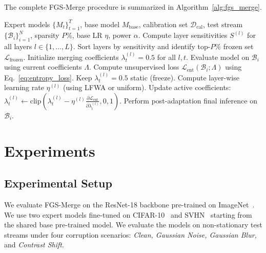 \documentclass{article}
\theoremstyle{plain}
\theoremstyle{definition}
\theoremstyle{remark}
\begin{document}
The complete FGS-Merge procedure is summarized in Algorithm~\ref{alg:fgs_merge}.

\begin{algorithm}[H]
\caption{Fisher-Guided Sparsity-Aware Model Merging (FGS-Merge)}
\label{alg:fgs_merge}
\begin{algorithmic}[1]
\REQUIRE Expert models $\{M_t\}_{t=1}^T$, base model $M_{\text{base}}$, calibration set $\mathcal{D}_{\text{cal}}$, test stream $\{\mathcal{B}_i\}_{i=1}^N$, sparsity $P\%$, base LR $\eta$, power $\alpha$.
\STATE Compute layer sensitivities $S^{(l)}$ for all layers $l \in \{1,\dots,L\}$.
\STATE Sort layers by sensitivity and identify top-$P\%$ frozen set $\mathcal{L}_{\text{frozen}}$.
\STATE Initialize merging coefficients $\lambda_t^{(l)} = 0.5$ for all $l, t$.
    \STATE Evaluate model on $\mathcal{B}_i$ using current coefficients $\Lambda$.
    \STATE Compute unsupervised loss $\mathcal{L}_{\text{ent}}(\mathcal{B}_i; \Lambda)$ using Eq.~\ref{eq:entropy_loss}.
            \STATE Keep $\lambda_t^{(l)} = 0.5$ static (freeze).
        \ELSE
            \STATE Compute layer-wise learning rate $\eta^{(l)}$ (using LFWA or uniform).
            \STATE Update active coefficients: \\
            $\lambda_t^{(l)} \leftarrow \text{clip}\left(\lambda_t^{(l)} - \eta^{(l)}\frac{\partial \mathcal{L}_{\text{ent}}}{\partial \lambda_t^{(l)}}, 0, 1\right)$.
        \ENDIF
    \ENDFOR
    \STATE Perform post-adaptation final inference on $\mathcal{B}_i$.
\ENDFOR
\end{algorithmic}
\end{algorithm}

\section{Experiments}
\label{submission:experiments}

\subsection{Experimental Setup}
We evaluate FGS-Merge on the ResNet-18 backbone pre-trained on ImageNet~\cite{he2016deep}. We use two expert models fine-tuned on CIFAR-10~\cite{krizhevsky2009learning} and SVHN~\cite{netzer2011reading} starting from the shared base pre-trained model. We evaluate the models on non-stationary test streams under four corruption scenarios: \textit{Clean, Gaussian Noise, Gaussian Blur,} and \textit{Contrast Shift}.
\end{document}

